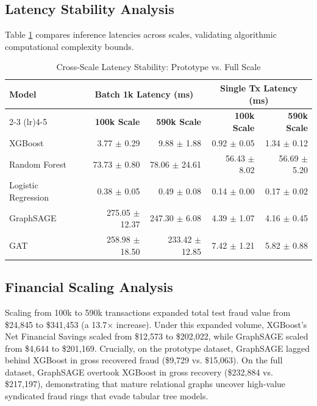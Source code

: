 \documentclass[11pt,a4paper]{report}
\begin{document}
\subsection{Latency Stability Analysis}
Table \ref{tab:cross_scale_latency} compares inference latencies across scales, validating algorithmic computational complexity bounds.

\begin{table}[H]
\centering
\caption{Cross-Scale Latency Stability: Prototype vs. Full Scale}
\label{tab:cross_scale_latency}
\begin{tabular}{lrrrr}
\toprule
\textbf{Model} & \multicolumn{2}{c}{\textbf{Batch 1k Latency (ms)}} & \multicolumn{2}{c}{\textbf{Single Tx Latency (ms)}} \\
\cmidrule(lr){2-3} \cmidrule(lr){4-5}
 & \textbf{100k Scale} & \textbf{590k Scale} & \textbf{100k Scale} & \textbf{590k Scale} \\
\midrule
XGBoost & 3.77 $\pm$ 0.29 & 9.88 $\pm$ 1.88 & 0.92 $\pm$ 0.05 & 1.34 $\pm$ 0.12 \\
Random Forest & 73.73 $\pm$ 0.80 & 78.06 $\pm$ 24.61 & 56.43 $\pm$ 8.02 & 56.69 $\pm$ 5.20 \\
Logistic Regression & 0.38 $\pm$ 0.05 & 0.49 $\pm$ 0.08 & 0.14 $\pm$ 0.00 & 0.17 $\pm$ 0.02 \\
GraphSAGE & 275.05 $\pm$ 12.37 & 247.30 $\pm$ 6.08 & 4.39 $\pm$ 1.07 & 4.16 $\pm$ 0.45 \\
GAT & 258.98 $\pm$ 18.50 & 233.42 $\pm$ 12.85 & 7.42 $\pm$ 1.21 & 5.82 $\pm$ 0.88 \\
\bottomrule
\end{tabular}
\end{table}

\subsection{Financial Scaling Analysis}
Scaling from 100k to 590k transactions expanded total test fraud value from \$24,845 to \$341,453 (a 13.7$\times$ increase). Under this expanded volume, XGBoost's Net Financial Savings scaled from \$12,573 to \$202,022, while GraphSAGE scaled from \$4,644 to \$201,169.
Crucially, on the prototype dataset, GraphSAGE lagged behind XGBoost in gross recovered fraud (\$9,729 vs. \$15,063). On the full dataset, GraphSAGE overtook XGBoost in gross recovery (\$232,884 vs. \$217,197), demonstrating that mature relational graphs uncover high-value syndicated fraud rings that evade tabular tree models.
\end{document}
